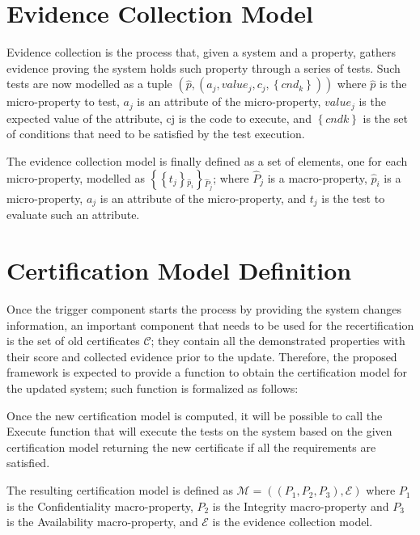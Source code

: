 \section{Evidence Collection Model}

Evidence collection is the process that, given a system and a property, gathers evidence proving the system holds such property through a series of tests. Such tests are now modelled as a tuple \( \left ( \hat{p}, \left (a_j, value_j, c_j, \left \{ cnd_k \right \} \right ) \right ) \)  where \( \hat{p} \) is the micro-property to test, \(a_j\) is an attribute of the micro-property, 
\(value_j\) is the expected value of the attribute, cj is the code to execute, and \( \left \{ cndk \right \} \) is the set of conditions that need to be satisfied by the test execution.

The evidence collection model is finally defined as a set of elements, one for each micro-property, modelled as \(  \left \{ \left \{ t_j \right \} {_{\hat{p}_i}} \right \} {_{\hat{P}_j}} \); where \( \hat{P}_j \) is a macro-property,  \( \hat{p}_i \) is a micro-property, \(a_j\) is an attribute of the micro-property, and \(t_j\) is the test to evaluate such an attribute.


\section{Certification Model Definition}
Once the trigger component starts the process by providing the system changes information, an important component that needs to be used for the recertification is the set of old certificates \(\mathcal{C}\); they contain all the demonstrated properties with their score and collected evidence prior to the update. Therefore, the proposed framework is expected to provide a function to obtain the certification model for the updated system; such function is formalized as follows:



Once the new certification model is computed, it will be possible to call the Execute function that will execute the tests on the system based on the given certification model returning the new certificate if all the requirements are satisfied.


The resulting certification model is defined as 
\(\mathcal{M} = \left ( \left ( P_1, P_2, P_3 \right ), \mathcal{E} \right )\) where \(P_1\) is the Confidentiality macro-property, \(P_2\) is the Integrity macro-property and \(P_3\) is the Availability macro-property, and \( \mathcal{E} \) is the evidence collection model.
 
